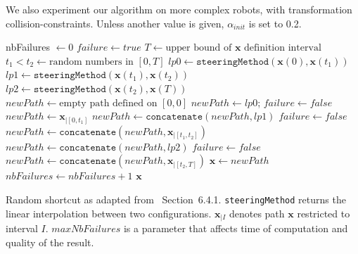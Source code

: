 \documentclass{tADR2e}
\newcommand\xx{\mathbf{x}} %
\begin{document}
We also experiment our algorithm on more complex robots, with transformation 
collision-constraints. Unless another value is given, $\alpha_{init}$ is set to 0.2.

\begin{algorithm}
\begin{algorithmic}[1] %
\Procedure{randomShortcut}{$\xx$}
   \State nbFailures $\gets 0$
        \State $failure \gets true$
        \State $T \gets \mbox{upper bound of }\xx\mbox{ definition interval}$
        \State $t_1 < t_2 \gets \mbox{random numbers in }[0,T]$
        \State $lp0 \gets \texttt{steeringMethod} (\xx(0), \xx(t_1))$
        \State $lp1 \gets \texttt{steeringMethod} (\xx(t_1), \xx(t_2))$
        \State $lp2 \gets \texttt{steeringMethod} (\xx(t_2), \xx(T))$
        \State $newPath \gets \mbox{empty path defined on }[0,0]$
          \State $newPath \gets lp0$; $failure \gets false$
        \Else
          \State $newPath \gets \xx_{|[0,t_1]}$
        \EndIf
          \State $newPath \gets \texttt{concatenate} (newPath, lp1)$
          \State $failure \gets false$
        \Else
          \State $newPath \gets \texttt{concatenate} (newPath, \xx_{|[t_1,t_2]})$
        \EndIf
          \State $newPath \gets \texttt{concatenate} (newPath, lp2)$
          \State $failure \gets false$
        \Else
          \State $newPath \gets \texttt{concatenate} (newPath, \xx_{|[t_2,T]})$
        \EndIf
        \State $\xx \gets newPath$
         $nbFailures \gets nbFailures + 1$
        \EndIf
      \EndWhile
    \Return $\xx$
\EndProcedure
\end{algorithmic}
\caption{Random shortcut as adapted from~\cite{Sekhavat-Svestka1998} 
Section~6.4.1. \texttt{steeringMethod} returns the linear interpolation between 
two configurations. $\xx_{|I}$ denotes path $\xx$ restricted to interval $I$. 
$maxNbFailures$ is a parameter that affects time of computation and quality of 
the result.}\label{algo:random-shortcut}
\end{algorithm}
\end{document}
